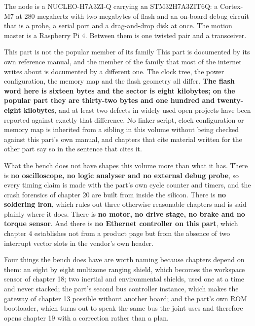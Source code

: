 The node is a NUCLEO-H7A3ZI-Q carrying an STM32H7A3ZIT6Q: a Cortex-M7 at 280
megahertz with two megabytes of flash and an on-board debug circuit that is a
probe, a serial port and a drag-and-drop disk at once. The motion master is a
Raspberry Pi 4. Between them is one twisted pair and a transceiver.

\begin{note}{This part is not the popular member of its family}
This part is documented by its own reference manual, and the member of the
family that most of the internet writes about is documented by a different one.
The clock tree, the power configuration, the memory map and the flash geometry
all differ. \textbf{The flash word here is sixteen bytes and the sector is eight
kilobytes; on the popular part they are thirty-two bytes and one hundred and
twenty-eight kilobytes}, and at least two defects in widely used open projects
have been reported against exactly that difference. No linker script, clock
configuration or memory map is inherited from a sibling in this volume without
being checked against this part's own manual, and chapters that cite material
written for the other part say so in the sentence that cites it.
\end{note}

What the bench does not have shapes this volume more than what it has. There is
\textbf{no oscilloscope, no logic analyser and no external debug probe}, so
every timing claim is made with the part's own cycle counter and timers, and the
crash forensics of chapter 20 are built from inside the silicon. There is
\textbf{no soldering iron}, which rules out three otherwise reasonable chapters
and is said plainly where it does. There is \textbf{no motor, no drive stage, no
brake and no torque sensor}. And there is \textbf{no Ethernet controller on this
part}, which chapter 4 establishes not from a product page but from the absence
of two interrupt vector slots in the vendor's own header.

Four things the bench does have are worth naming because chapters depend on
them: an eight by eight multizone ranging shield, which becomes the workspace
sensor of chapter 18; two inertial and environmental shields, used one at a time
and never stacked; the part's second bus controller instance, which makes the
gateway of chapter 13 possible without another board; and the part's own ROM
bootloader, which turns out to speak the same bus the joint uses and therefore
opens chapter 19 with a correction rather than a plan.

